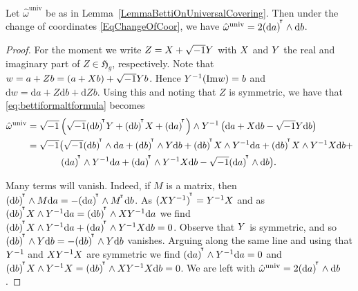 \begin{lemma}\label{LemmaBettiFormComplexReal}
Let $\hat{\omega}^{\mathrm{univ}}$ be as in
Lemma~\ref{LemmaBettiOnUniversalCovering}. Then under the change of
coordinates \eqref{EqChangeOfCoor}, we have 
$\hat{\omega}^{\mathrm{univ}}=2{{(\mathrm{d}a)}}^{\!^{\intercal}} \wedge \mathrm{d}
b$.
\end{lemma}
\begin{proof} For the moment we write $Z = X + \sqrt{-1}Y$ with $X$ and $Y$ the real and
imaginary part of $Z\in\mathfrak{H}_g$, respectively. 
Note that $w = a + Zb = (a + X b) + \sqrt{-1}Y b$. Hence
$Y^{-1}(\mathrm{Im}w) = b$ and $\mathrm{d}w = \mathrm{d}a +
Z\mathrm{d}b + \mathrm{d}Z  b$. Using this and noting that $Z$
is symmetric, we have that \eqref{eq:bettiformaltformula} becomes
\begin{equation*}
\begin{aligned}
    \hat \omega^{\mathrm{univ}} &=\sqrt{-1}\left( \sqrt{-1}\tran{(\rmd
        b)} \Y + \tran{(\rmd b)} \X + \tran{(\rmd a)}\right) \wedge \Y^{-1}
    \left(\rmd a + \X \rmd b - \sqrt{-1} \Y \rmd b\right) \\
    &=\sqrt{-1}\bigl(\sqrt{-1} \tran{(\rmd b)}\wedge\rmd a + \tran{(\rmd b)}\wedge
    \Y \rmd b + \tran{(\rmd b)} \X \wedge \Y^{-1} \rmd a+ \tran{(\rmd
      b)}\X\wedge 
    \Y^{-1}\X \rmd b + \\ 
    &\phantom{=\sqrt{-1}\bigl(}\tran{(\rmd a)} \wedge \Y^{-1} \rmd a 
    + \tran{(\rmd a)}\wedge \Y^{-1}\X\rmd b -
    \sqrt{-1} \tran{(\rmd a)}\wedge \rmd b\bigr).
\end{aligned}
\end{equation*}

 Many terms will vanish. Indeed, if $M$ is a
matrix, then ${{(\mathrm{d} b)}}^{\!^{\intercal}} \wedge M \mathrm{d} a = - {{(\mathrm{d}
a)}}^{\!^{\intercal}}\wedge {{M}}^{\!^{\intercal}} \mathrm{d} b $. As ${{(XY^{-1})}}^{\!^{\intercal}} = Y^{-1}X$ and as
${{(\mathrm{d} b)}}^{\!^{\intercal}} X \wedge Y^{-1} \mathrm{d} a={{(\mathrm{d}
b)}}^{\!^{\intercal}} \wedge XY^{-1} \mathrm{d} a$ we find
${{(\mathrm{d} b)}}^{\!^{\intercal}}X \wedge Y^{-1} \mathrm{d} a + {{(\mathrm{d} a)}}^{\!^{\intercal}}\wedge
Y^{-1}X \mathrm{d} b=0$. Observe that $Y$ is symmetric, and so ${{(\mathrm{d}
b)}}^{\!^{\intercal}}\wedge Y \mathrm{d} b = -{{(\mathrm{d} b)}}^{\!^{\intercal}}\wedge Y\mathrm{d} b$ vanishes. Arguing
along the same line and using that
$Y^{-1}$ and $XY^{-1}X$ are  symmetric we find ${{(\mathrm{d}
a)}}^{\!^{\intercal}}\wedge Y^{-1} \mathrm{d} a = 0$ and ${{(\mathrm{d} b)}}^{\!^{\intercal}}X\wedge Y^{-1}X={{(\mathrm{d} b)}}^{\!^{\intercal}}\wedge XY^{-1}X \mathrm{d}
b=0$. We are left with
$    \hat \omega^{\mathrm{univ}} = 2{{(\mathrm{d} a)}}^{\!^{\intercal}} \wedge \mathrm{d} b$. 
\end{proof}


